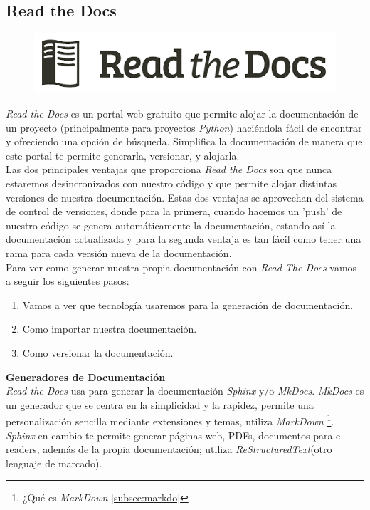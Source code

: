 \subsection{Read the Docs}
\label{subsec:readthedocs}
\begin{figure}[h]
    \centering
    \includegraphics[scale=0.6]{img/logo_readthedocs.png}
    \label{fig:logoReadThe}
\end{figure}
\emph{Read the Docs} es un portal web gratuito que permite alojar la documentación de un proyecto (principalmente para proyectos \emph{Python}) haciéndola fácil de encontrar y ofreciendo una opción de búsqueda. Simplifica la documentación de manera que este portal te permite generarla, versionar, y alojarla.\\
Las dos principales ventajas que proporciona \emph{Read the Docs} son que nunca estaremos desincronizados con nuestro código y que permite alojar distintas versiones de nuestra documentación. Estas dos ventajas se aprovechan del sistema de control de versiones, donde para la primera, cuando hacemos un 'push' de nuestro código se genera automáticamente la documentación, estando así la documentación actualizada y para la segunda ventaja es tan fácil como tener una rama para cada versión nueva de la documentación. \\
Para ver como generar nuestra propia documentación con \emph{Read The Docs} vamos a seguir los siguientes pasos:
\begin{enumerate}
    \item Vamos a ver que tecnología usaremos para la generación de documentación.
    \item Como importar nuestra documentación.
    \item Como versionar la documentación.
\end{enumerate}
\textbf{Generadores de Documentación} \\
\emph{Read the Docs} usa para generar la documentación \emph{Sphinx} y/o \emph{MkDocs}. \emph{MkDocs} es un generador que se centra en la simplicidad y la rapidez, permite una personalización  sencilla mediante extensiones y temas, utiliza  \emph{MarkDown} \footnote{¿Qué es \emph{MarkDown} \ref{subsec:markdo}}. \emph{Sphinx} en cambio te permite generar páginas web, PDFs, documentos para e-readers, además de la propia documentación; utiliza \emph{ReStructuredText}(otro lenguaje de marcado).\\
